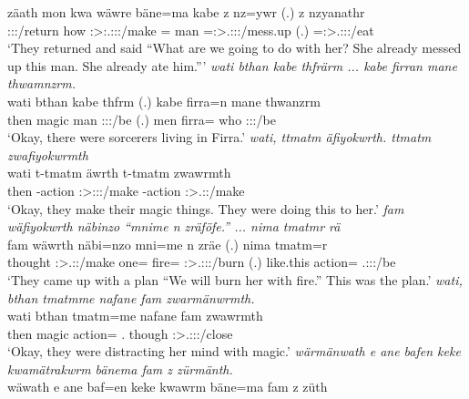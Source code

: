 \begin{exe}
	\gll zäath mon kwa wäwre bäne=ma kabe z nz=ywr (.) z nzyanathr\\
	\Stpl:\Sbj:\Pst:\Pfv/return how \Fut{} \Fpl:\Sbj>:\Tsg.\F:\Obj:\Nonpast:\Ipfv/make \Recog=\Char{} man \Iam{} \Immpst=\Stsg:\Sbj>\Tsg.\Masc:\Obj:\Nonpast:\Ipfv/mess.up (.) \Iam{} \Immpst=\Stsg:\Sbj>\Tsg.\Masc:\Obj:\Nonpast:\Ipfv/eat\\
	\trans `They returned and said ``What are we going to do with her? She already messed up this man. She already ate him.'''
	\emph{wati bthan kabe thfrärm ... kabe firran mane thwamnzrm.}\\
	\gll wati bthan kabe thfrm (.) kabe firra=n mane thwanzrm\\
	then magic man \Stpl:\Sbj:\Pst:\Dur/be (.) men firra=\Loc{} who \Stpl:\Sbj:\Pst:\Dur/be\\
	\trans `Okay, there were sorcerers living in Firra.'
	\emph{wati, ttmatm äfiyokwrth. ttmatm zwafiyokwrmth}\\
	\gll wati t-tmatm äwrth t-tmatm zwawrmth\\
	then \Redup-action \Stpl:\Sbj>\Stpl:\Obj:\Nonpast:\Ipfv/make \Redup-action \Stpl:\Sbj>\Tsg.\F:\Pst:\Dur/make\\
	\trans `Okay, they make their magic things. They were doing this to her.'
	\emph{fam wäfiyokwrth näbinzo ``mnime n zräföfe.'' ... nima tmatmr rä}\\
	\gll fam wäwrth näbi=nzo mni=me n zräe (.) nima tmatm=r \\
	thought \Stpl:\Sbj>\Tsg.\F:\Nonpast:\Ipfv/make one=\Only{} fire=\Ins{} \Imn{} \Fpl:\Sbj>\Tsg.\F:\Obj:\Irr:\Pfv/burn (.) {like.this} action=\Purp{} \Tsg.\F:\Sbj:\Nonpast:\Ipfv/be\\
	\trans `They came up with a plan ``We will burn her with fire.'' This was the plan.'
	\emph{wati, bthan tmatmme nafane fam zwarmänwrmth.}\\
	\gll wati bthan tmatm=me nafane fam zwawrmth\\
	then magic action=\Ins{} \Tsg.\Poss{} though \Stpl:\Sbj>\Tsg.\F:\Io:\Pst:\Dur/close\\
	\trans `Okay, they were distracting her mind with magic.'
	\emph{wärmänwath e ane bafen keke kwamätrakwrm bänema fam z zürmänth.}\\
	\gll wäwath e ane baf=en keke kwawrm bäne=ma fam z züth\\

\end{exe}
